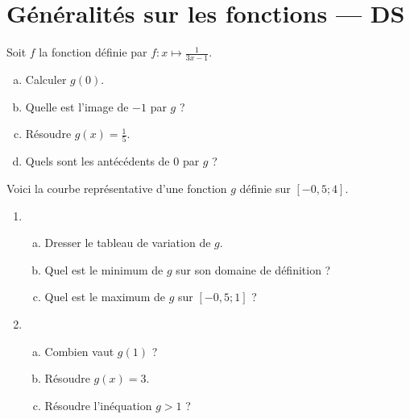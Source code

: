 \documentclass[12pt]{article}
\begin{document}
  \section*{Généralités sur les fonctions --- DS}

  \begin{exercice}
    Soit $f$ la fonction définie par $f:x\mapsto \frac{1}{3x-1}$.
    \begin{enumerate}[(a)]
      \item Calculer $g(0)$.
      \item Quelle est l'image de $-1$ par $g$ ?
      \item Résoudre $g(x)=\frac{1}{5}$.
      \item Quels sont les antécédents de 0 par $g$ ?
    \end{enumerate}
  \end{exercice}

  \begin{exercice} Voici la courbe
    représentative d'une fonction $g$ définie sur $\left[-0,5;4\right]$.
    \begin{center}
    \end{center}

    \begin{enumerate}[{Question} 1 :]
      \item
        \begin{enumerate}[(a)]
          \item Dresser le tableau de variation de $g$.
          \item Quel est le minimum de $g$ sur son domaine de définition ?
          \item Quel est le maximum de $g$ sur $\left[-0,5;1\right]$ ?
        \end{enumerate}

      \item
        \begin{enumerate}[(a)]
          \item Combien vaut $g(1)$ ?
          \item Résoudre $g(x)=3$.
          \item Résoudre l'inéquation $g>1$ ?
        \end{enumerate}
    \end{enumerate}

  \end{exercice}
\end{document}
